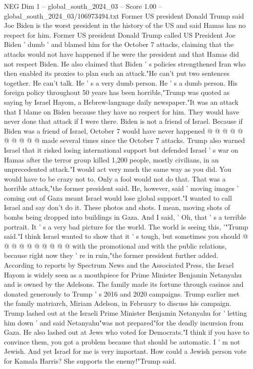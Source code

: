 \begin{textsample}{NEG Dim 1 – global\_south\_2024\_03 – Score 1.00 – global\_south\_2024\_03/106973494.txt}  \label{ex:f1_neg_113}
Former US president Donald Trump said Joe Biden is the worst president in the history of the US and said Hamas has no respect for him.
Former US president Donald Trump called US President Joe Biden ' dumb ' and blamed him for the October 7 attacks, claiming that the attacks would not have happened if he were the president and that Hamas did not respect Biden.
He also claimed that Biden ' s policies strengthened Iran who then enabled its proxies to plan such an attack."He can't put two sentences together.
He can't talk.
He ' s a very dumb person.
He ' s a dumb person.
His foreign policy throughout 50 years has been horrible,"Trump was quoted as saying by Israel Hayom, a Hebrew-language daily newspaper."It was an attack that I blame on Biden because they have no respect for him.
They would have never done that attack if I were there.
Biden is not a friend of Israel.
Because if Biden was a friend of Israel, October 7 would have never happened @ @ @ @ @ @ @ @ @ @ made several times since the October 7 attacks.
Trump also warned Israel that it risked losing international support but defended Israel ' s war on Hamas after the terror group killed 1,200 people, mostly civilians, in an unprecedented attack."I would act very much the same way as you did.
You would have to be crazy not to.
Only a fool would not do that.
That was a horrible attack,"the former president said.
He, however, said ' moving images ' coming out of Gaza meant Israel would lose global support."I wanted to call Israel and say don't do it.
These photos and shots.
I mean, moving shots of bombs being dropped into buildings in Gaza.
And I said, ' Oh, that ' s a terrible portrait.
It ' s a very bad picture for the world.
The world is seeing this, '"Trump said."I think Israel wanted to show that it ' s tough, but sometimes you should @ @ @ @ @ @ @ @ @ @ with the promotional and with the public relations, because right now they ' re in ruin,"the former president further added.
According to reports by Spectrum News and the Associated Press, the Israel Hayom is widely seen as a mouthpiece for Prime Minister Benjamin Netanyahu and is owned by the Adelsons.
The family made its fortune through casinos and donated generously to Trump ' s 2016 and 2020 campaigns.
Trump earlier met the family matriarch, Miriam Adelson, in February to discuss his campaign.
Trump lashed out at the Israeli Prime Minister Benjamin Netanyahu for ' letting him down ' and said Netanyahu"was not prepared"for the deadly incursion from Gaza.
He also lashed out at Jews who voted for Democrats."I think if you have to convince them, you got a problem because that should be automatic.
I ' m not Jewish.
And yet Israel for me is very important.
How could a Jewish person vote for Kamala Harris?
She supports the enemy!"Trump said.

\end{textsample}
